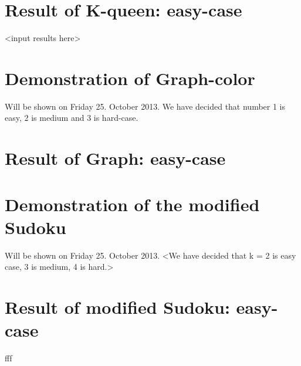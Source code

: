 \documentclass[12pt, a4paper]{article}
\begin{document}
\section{Result of K-queen: easy-case}
<input results here>

\section{Demonstration of Graph-color}
Will be shown on Friday 25. October 2013.
We have decided that number 1 is easy, 2 is medium and 3 is hard-case. 

\section{Result of Graph: easy-case}

\section{Demonstration of the modified Sudoku}
Will be shown on Friday 25. October 2013.
<We have decided that k = 2 is easy case, 3 is medium, 4 is hard.>

\section{Result of modified Sudoku: easy-case}
fff
\end{document}
